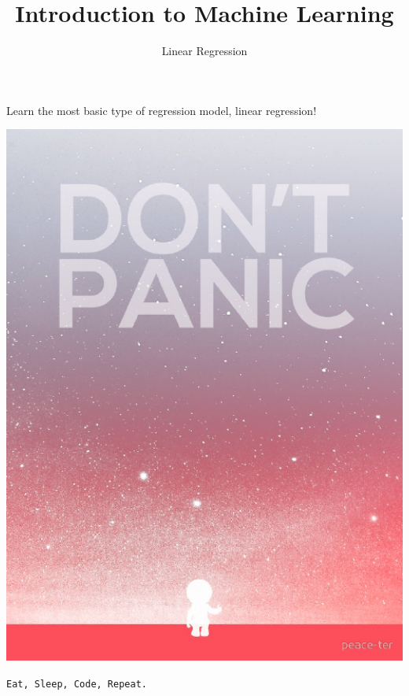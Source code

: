 \documentclass{42-en}
\begin{document}
\title{Introduction to Machine Learning}
\subtitle{Linear Regression}


\summary
{
Learn the most basic type of regression model, linear regression! 
}

\maketitle

\tableofcontents


\newpage

\bigskip

\centerline{\includegraphics[width=150mm]{images/dontpanic.png}}

\centerline{\texttt{Eat, Sleep, Code, Repeat.}}

\end{document}
